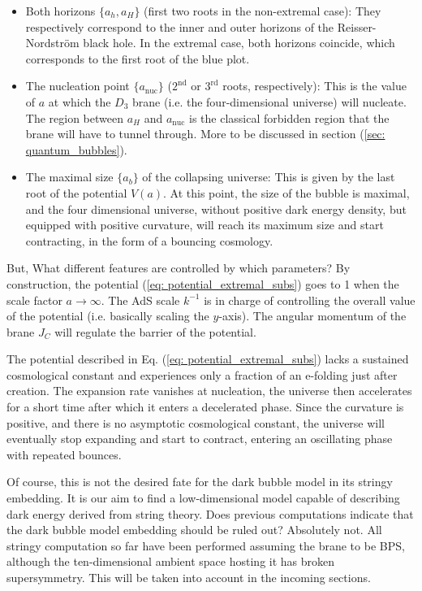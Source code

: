 \begin{itemize}
    \item Both horizons $\{a_{h}, a_{H}\}$ (first two roots in the non-extremal case): They respectively correspond to the inner and outer horizons of the Reisser-Nordström black hole. In the extremal case, both horizons coincide, which corresponds to the first root of the blue plot. 
    \item The nucleation point $\{a_{\text{nuc}}\}$ ($2^{\text{nd}}$ or $3^{\text{rd}}$ roots, respectively): This is the value of $a$ at which the $D_{3}$ brane (i.e. the four-dimensional universe) will nucleate. The region between $a_{H}$ and $a_{\text{nuc}}$ is the classical forbidden region that the brane will have to tunnel through. More to be discussed in section (\ref{sec: quantum_bubbles}).
    \item The maximal size $\{a_{b}\}$ of the collapsing universe:  This is given by the last root of the potential $V(a)$. At this point, the size of the bubble is maximal, and the four dimensional universe, without positive dark energy density, but equipped with positive curvature, will reach its maximum size and start contracting, in the form of a bouncing cosmology.
\end{itemize}
But, What different features are controlled by which parameters? By construction, the potential (\ref{eq: potential_extremal_subs}) goes to 1 when the scale factor $a\rightarrow \infty$. The AdS scale $k^{-1}$ is in charge of controlling the overall value of the potential (i.e. basically scaling the $y$-axis). The angular momentum of the brane $J_{C}$ will regulate the barrier of the potential.

The potential described in Eq. (\ref{eq: potential_extremal_subs}) lacks a sustained cosmological constant and experiences only a fraction of an e-folding just after creation. The expansion rate vanishes at nucleation, the universe then accelerates for a short time after which it enters a decelerated phase. Since the curvature is positive, and there is no asymptotic cosmological constant, the universe will eventually stop expanding and start to contract, entering an oscillating phase with repeated bounces. 

Of course, this is not the desired fate for the dark bubble model in its stringy embedding. It is our aim to find a low-dimensional model capable of describing dark energy derived from string theory. Does previous computations indicate that the dark bubble model embedding should be ruled out? Absolutely not. All stringy computation so far have been performed assuming the brane to be BPS, although the ten-dimensional ambient space hosting it has broken supersymmetry. This will be taken into account in the incoming sections.


